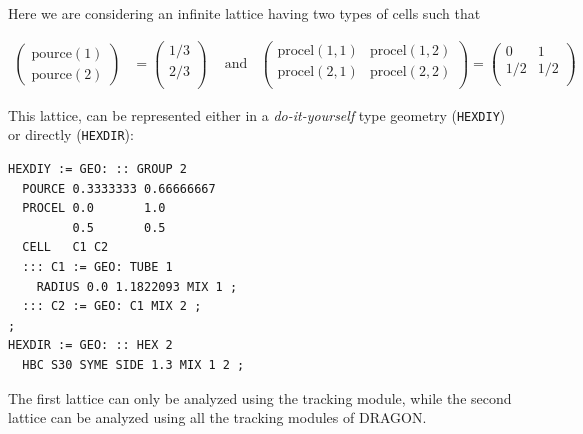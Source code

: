 \begin{itemize}
Here we are considering an infinite lattice having two types of cells such
that

\begin{align*}
\begin{pmatrix}\text{pource}(1) \\ \text{pource}(2) \end{pmatrix}&=
\begin{pmatrix}1/3 \\ 2/3 \\ \end{pmatrix}\ \ \ \ \text{ and} \ \ \ \ 
\begin{pmatrix} \text{procel}(1,1) & \text{procel}(1,2) \\ \text{procel}(2,1) & \text{procel}(2,2) \\ \end{pmatrix}=
\begin{pmatrix}0 & 1 \\ 1/2 & 1/2 \\ \end{pmatrix}
\end{align*}

This lattice, can be represented either in a {\sl do-it-yourself} type geometry
({\tt HEXDIY}) or directly ({\tt HEXDIR}):

\begin{verbatim}
HEXDIY := GEO: :: GROUP 2
  POURCE 0.3333333 0.66666667
  PROCEL 0.0       1.0
         0.5       0.5
  CELL   C1 C2
  ::: C1 := GEO: TUBE 1
    RADIUS 0.0 1.1822093 MIX 1 ;
  ::: C2 := GEO: C1 MIX 2 ;
;
HEXDIR := GEO: :: HEX 2
  HBC S30 SYME SIDE 1.3 MIX 1 2 ;
\end{verbatim}

The first lattice can only be analyzed using the  tracking module,
while the second lattice can be analyzed using all the tracking
modules of DRAGON. 

\end{itemize}

\eject
